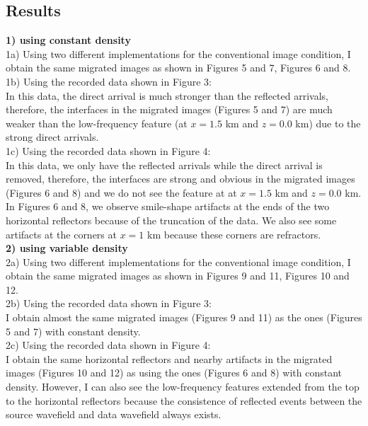 \subsection{Results}
\textbf{1) using constant density}\\
1a) Using two different implementations for the conventional image condition, I
obtain the same migrated images as shown in Figures 5 and 7, Figures 6 and 8.\\
1b) Using the recorded data shown in Figure 3:\\ 
In this data, the direct arrival is much stronger than the reflected arrivals, 
therefore, the interfaces in the migrated images (Figures 5 and 7) are much 
weaker than the low-frequency feature (at $x=1.5$ km and $z=0.0$ km) due to the 
strong direct arrivals.\\
1c) Using the recorded data shown in Figure 4:\\ 
In this data, we only have the reflected arrivals while the direct arrival is
removed, therefore, the interfaces are strong and obvious in the migrated images
(Figures 6 and 8) and we do not see the feature at at $x=1.5$ km and $z=0.0$ km. 
In Figures 6 and 8, we observe smile-shape artifacts at the ends of the two 
horizontal reflectors because of the truncation of the data. We also see some
artifacts at the corners at $x=1$ km because these corners are refractors.\\
\textbf{2) using variable density}\\
2a) Using two different implementations for the conventional image condition, I
obtain the same migrated images as shown in Figures 9 and 11, Figures 10 and 12.\\
2b) Using the recorded data shown in Figure 3:\\ 
I obtain almost the same migrated images (Figures 9 and 11) as the ones (Figures 5
and 7) with constant density.\\
2c) Using the recorded data shown in Figure 4:\\ 
I obtain the same horizontal reflectors and nearby artifacts in the migrated
images (Figures 10 and 12) as using the ones (Figures 6 and 8) with constant 
density. However, I can also see the low-frequency features extended from the
top to the horizontal reflectors because the consistence of reflected events
between the source wavefield and data wavefield always exists.


\newpage
